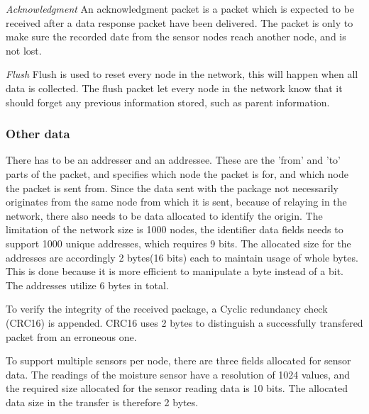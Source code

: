 \textit{Acknowledgment}\newline
An acknowledgment packet is a packet which is expected to be received after a data response packet have been delivered.
The packet is only to make sure the recorded date from the sensor nodes reach another node, and is not lost.

\textit{Flush}\newline
Flush is used to reset every node in the network, this will happen when all data is collected.
The flush packet let every node in the network know that it should forget any previous information stored, such as parent information.

\subsubsection{Other data}
There has to be an addresser and an addressee. These are the 'from' and 'to' parts of the packet, and specifies which node the packet is for, and which node the packet is sent from.
Since the data sent with the package not necessarily originates from the same node from which it is sent, because of relaying in the network, there also needs to be data allocated to identify the origin.
The limitation of the network size is 1000 nodes, the identifier data fields needs to support 1000 unique addresses, which requires 9 bits. The allocated size for the addresses are accordingly 2 bytes(16 bits) each to maintain usage of whole bytes. This is done because it is more efficient to manipulate a byte instead of a bit.\cite{bytevsbit} The addresses utilize 6 bytes in total.

To verify the integrity of the received package, a Cyclic redundancy check (CRC16) is appended. CRC16 uses 2 bytes to distinguish a successfully transfered packet from an erroneous one. 

To support multiple sensors per node, there are three fields allocated for sensor data.
The readings of the moisture sensor have a resolution of 1024 values, and the required size allocated for the sensor reading data is 10 bits. The allocated data size in the transfer is therefore 2 bytes.

